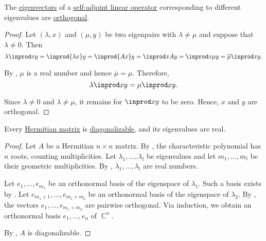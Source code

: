 \begin{lemma}\label{thm:hermitian_operator_eigenvectors_are_orthogonal}
  The \hyperref[def:eigenpair]{eigenvectors} of a \hyperref[def:adjoint_operator]{self-adjoint linear operator} corresponding to different eigenvalues are \hyperref[def:orthogonality]{orthogonal}.
\end{lemma}
\begin{proof}
  Let \( (\lambda, x) \) and \( (\mu, y) \) be two eigenpairs with \( \lambda \neq \mu \) and suppose that \( \lambda \neq 0 \). Then
  \begin{equation*}
    \lambda \inprod x y
    =
    \inprod {\lambda x} y
    =
    \inprod {A x} y
    =
    \inprod x {A y}
    =
    \inprod x {\mu y}
    =
    \overline \mu \inprod x y.
  \end{equation*}

  By , \( \mu \) is a real number and hence \( \overline \mu = \mu \). Therefore,
  \begin{equation*}
    \lambda \inprod x y = \mu \inprod x y.
  \end{equation*}

  Since \( \lambda \neq 0 \) and \( \lambda \neq \mu \), it remains for \( \inprod x y \) to be zero. Hence, \( x \) and \( y \) are orthogonal.
\end{proof}

\begin{proposition}\label{thm:hermitian_matrix_is_diagonalizable}
  Every \hyperref[def:conjugate_transpose]{Hermitian matrix} is \hyperref[def:diagonalizable_matrix]{diagonalizable}, and its eigenvalues are real.
\end{proposition}
\begin{proof}
  Let \( A \) be a Hermitian \( n \times n \) matrix. By , the characteristic polynomial has \( n \) roots, counting multiplicities. Let \( \lambda_1, \ldots, \lambda_l \) be eigenvalues and let \( m_1, \ldots, m_l \) be their geometric multiplicities. By , \( \lambda_1, \ldots, \lambda_l \) are real numbers.

  Let \( e_1, \ldots, e_{m_1} \) be an orthonormal basis of the eigenspace of \( \lambda_1 \). Such a basis exists by . Let \( e_{m_1+1}, \ldots, e_{m_1+m_2} \) be an orthonormal basis of the eigenspace of \( \lambda_2 \). By , the vectors \( e_1, \ldots, e_{m_1+m_2} \) are pairwise orthogonal. Via induction, we obtain an orthonormal basis \( e_1, \ldots, e_n \) of \( \BbbC^n \).

  By , \( A \) is diagonalizable.
\end{proof}
